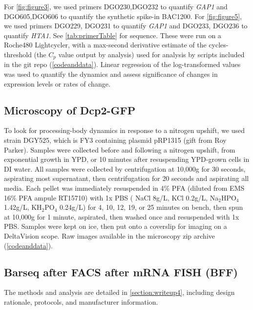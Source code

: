 {For \autoref{fig:figure3}, we used primers 
DGO230,DGO232 to quantify \textit{GAP1} and 
DGO605,DGO606 to quantify the synthetic spike-in BAC1200.
For \autoref{fig:figure5}, we used primers
DGO229, DGO231 to quantify \textit{GAP1} and
DGO233, DGO236 to quantify \textit{HTA1}.  
See \autoref{tab:primerTable} for sequence.
These were run on a Roche480 Lightcycler, 
with a max-second derivative estimate
of the cycles-threshold (the $C_p$ value output by analysis) used 
for analysis by scripts included in the git repo 
(\autoref{codeanddata}).
Linear regression of the log-transformed values was used to quantify
the dynamics and assess significance of changes in expression
levels or rates of change.

\subsection{Microscopy of Dcp2-GFP}

To look for processing-body dynamics in response to
a nitrogen upshift, we used strain DGY525, which is FY3
containing plasmid pRP1315 (gift from Roy Parker).
Samples were collected before and following a nitrogen upshift,
from exponential growth in YPD, or 10 minutes after resuspending
YPD-grown cells in DI water.
All samples were collected by centrifugation at 10,000g for 30 seconds, 
aspirating most supernatant, then centrifugation for 20 seconds
and aspirating all media. Each pellet was 
immediately resuspended in 4\% PFA 
(diluted from EMS 16\% PFA ampule RT15710) 
with 1x PBS ( NaCl 8g/L, KCl 0.2g/L, Na$_2$HPO$_4$ 1.42g/L, 
KH$_2$PO$_4$ 0.24g/L) for 4, 10, 12, 19, or 25
minutes on bench, then spun at 10,000g for 1 minute, aspirated, 
then washed once and resuspended with 1x PBS. 
Samples were kept on ice, then put onto a coverslip
for imaging on a DeltaVision scope. Raw images available in the
microscopy zip archive (\autoref{codeanddata}).


\subsection{Barseq after FACS after mRNA FISH (BFF)}

The methods and analysis are detailed in \autoref{section:writeup4},
including design rationale, protocols, and manufacturer information.

}
